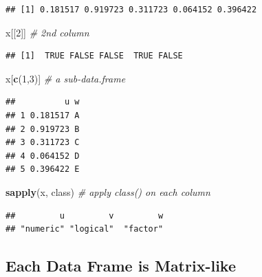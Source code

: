 \documentclass[10pt,b5paper,krantz1]{krantz}
\newenvironment{Shaded}{\begin{snugshade}}{\end{snugshade}}
\newcommand{\CommentTok}[1]{\textcolor[rgb]{0.37,0.37,0.37}{\textit{#1}}}
\newcommand{\DecValTok}[1]{\textcolor[rgb]{0.06,0.06,0.06}{#1}}
\newcommand{\KeywordTok}[1]{\textcolor[rgb]{0.27,0.27,0.27}{\textbf{#1}}}
\newcommand{\NormalTok}[1]{#1}
\newcommand{\OperatorTok}[1]{\textcolor[rgb]{0.43,0.43,0.43}{\textbf{#1}}}
\begin{document}
\begin{Shaded}
\end{Shaded}

\begin{verbatim}
## [1] 0.181517 0.919723 0.311723 0.064152 0.396422
\end{verbatim}

\begin{Shaded}
\begin{Highlighting}[]
\NormalTok{x[[}\DecValTok{2}\NormalTok{]] }\CommentTok{# 2nd column}
\end{Highlighting}
\end{Shaded}

\begin{verbatim}
## [1]  TRUE FALSE FALSE  TRUE FALSE
\end{verbatim}

\begin{Shaded}
\begin{Highlighting}[]
\NormalTok{x[}\KeywordTok{c}\NormalTok{(}\DecValTok{1}\NormalTok{,}\DecValTok{3}\NormalTok{)] }\CommentTok{# a sub-data.frame}
\end{Highlighting}
\end{Shaded}

\begin{verbatim}
##          u w
## 1 0.181517 A
## 2 0.919723 B
## 3 0.311723 C
## 4 0.064152 D
## 5 0.396422 E
\end{verbatim}

\begin{Shaded}
\begin{Highlighting}[]
\KeywordTok{sapply}\NormalTok{(x, class) }\CommentTok{# apply class() on each column}
\end{Highlighting}
\end{Shaded}

\begin{verbatim}
##         u         v         w 
## "numeric" "logical"  "factor"
\end{verbatim}

\hypertarget{each-data-frame-is-matrix-like}{%
\subsection{Each Data Frame is Matrix-like}\label{each-data-frame-is-matrix-like}}
\end{document}
